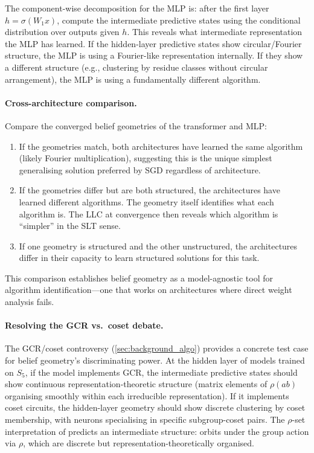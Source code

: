 \documentclass[11pt,a4paper]{article}
\begin{document}
The component-wise decomposition for the MLP is: after the first layer $h = \sigma(W_1 x)$, compute the intermediate predictive states using the conditional distribution over outputs given $h$. This reveals what intermediate representation the MLP has learned. If the hidden-layer predictive states show circular/Fourier structure, the MLP is using a Fourier-like representation internally. If they show a different structure (e.g., clustering by residue classes without circular arrangement), the MLP is using a fundamentally different algorithm.

\paragraph{Cross-architecture comparison.} Compare the converged belief geometries of the transformer and MLP:
\begin{enumerate}[label=(\alph*)]
    \item If the geometries match, both architectures have learned the same algorithm (likely Fourier multiplication), suggesting this is the unique simplest generalising solution preferred by SGD regardless of architecture.
    \item If the geometries differ but are both structured, the architectures have learned different algorithms. The geometry itself identifies what each algorithm is. The LLC at convergence then reveals which algorithm is ``simpler'' in the SLT sense.
    \item If one geometry is structured and the other unstructured, the architectures differ in their capacity to learn structured solutions for this task.
\end{enumerate}

This comparison establishes belief geometry as a model-agnostic tool for algorithm identification---one that works on architectures where direct weight analysis fails.

\paragraph{Resolving the GCR vs.\ coset debate.} The GCR/coset controversy (\cref{sec:background_algo}) provides a concrete test case for belief geometry's discriminating power. At the hidden layer of models trained on $S_5$, if the model implements GCR, the intermediate predictive states should show continuous representation-theoretic structure (matrix elements of $\rho(ab)$ organising smoothly within each irreducible representation). If it implements coset circuits, the hidden-layer geometry should show discrete clustering by coset membership, with neurons specialising in specific subgroup-coset pairs. The $\rho$-set interpretation of \citet{wu2024unified} predicts an intermediate structure: orbits under the group action via $\rho$, which are discrete but representation-theoretically organised.
\end{document}
